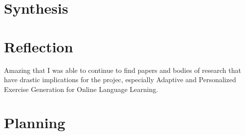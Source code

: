 \documentclass[
	letterpaper, %
]{jdf}
\begin{document}
\section{Synthesis}


\section{Reflection}
Amazing that I was able to continue to find papers and bodies of research that have drastic implications for the projec, especially Adaptive and Personalized Exercise Generation  for Online Language Learning.

\section{Planning}


\printbibliography{}
\end{document}
